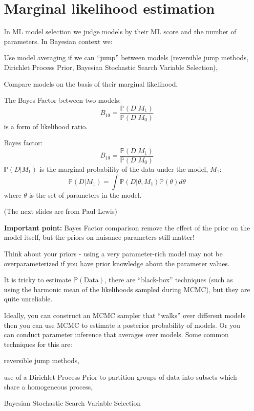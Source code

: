 
\usepackage{cancel}
\renewcommand{\Pr}{\mathbb{P}}
\newcommand{\accept}[2]{\alpha({#1,#2})}
\newcommand{\prop}[2]{q(#1,#2)}


\pagecolor{white}
\MyLogo{}
\unitlength=1mm


\section*{Marginal likelihood estimation}
In ML model selection we judge models by their ML score and the number of parameters.
In Bayesian context we:
\begin{compactitem}
	\item Use model averaging if we can ``jump'' between models (reversible jump methods, Dirichlet Process Prior, Bayesian Stochastic Search Variable Selection),
	\item Compare models on the basis of their marginal likelihood.
\end{compactitem}

The Bayes Factor between two models:
\[B_{10} = \frac{\Pr(D|M_1)}{\Pr(D|M_0)}\]
 is a form of likelihood ratio.\\
\myNewSlide

\myNewSlide
Bayes factor:
\[B_{10} = \frac{\Pr(D|M_1)}{\Pr(D|M_0)}\]
\vskip 2cm
$\Pr(D|M_1)$ is the marginal probability of the data under the model, $M_1$:
\[\Pr(D|M_1) = \int\Pr(D|\theta, M_1)\Pr(\theta)d\theta \]
where $\theta$ is the set of parameters in the model.


{\small (The next slides are from Paul Lewis)}

 

\myNewSlide
 

\myNewSlide
{\bf Important point:} Bayes Factor comparison remove the effect of the prior on the model itself, but the priors on nuisance parameters still matter!

Think about your priors - using a very parameter-rich model may not be overparameterized if you have prior knowledge about the parameter values.

It is tricky to estimate $\Pr(\mbox{Data})$, there are ``black-box'' techniques (such as using the harmonic mean of the likelihoods sampled during MCMC), but they are quite unreliable.

Ideally, you can construct an MCMC sampler that ``walks'' over different models then you can use MCMC to estimate a posterior probability of models.
Or you can conduct parameter inference that averages over models. 
Some common techniques for this are:
\begin{compactitem}
	\item reversible jump methods, 
	\item use of a Dirichlet Process Prior to partition groups of data into subsets which share a homogeneous process,
	\item  Bayesian Stochastic Search Variable Selection
\end{compactitem}

